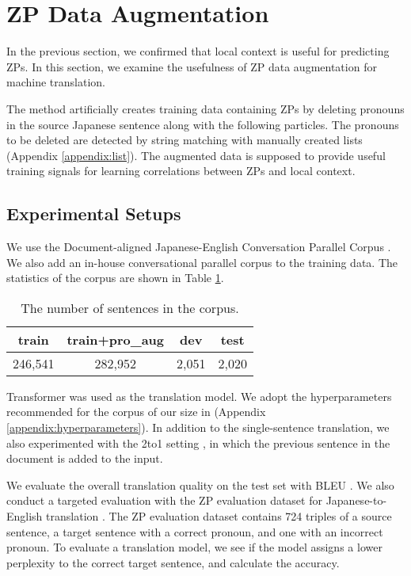 \section{ZP Data Augmentation}
\label{section:experiments}

In the previous section, we confirmed that local context is useful for predicting ZPs.
In this section, we examine the usefulness of ZP data augmentation for machine translation.

The method artificially creates training data containing ZPs by deleting pronouns in the source Japanese sentence along with the following particles.
The pronouns to be deleted are detected by string matching with manually created lists (Appendix \ref{appendix:list}).
The augmented data is supposed to provide useful training signals for learning correlations between ZPs and local context.


\subsection{Experimental Setups}
We use the Document-aligned Japanese-English Conversation Parallel Corpus \citep{rikters-EtAl:2020:WMT}.
We also add an in-house conversational parallel corpus to the training data. The statistics of the corpus are shown in Table \ref{corpus:stat}.

\begin{table}[!h]
\centering
\begin{tabular}{cccc} \toprule
train    & train+pro\_aug     & dev       & test     \\ \midrule
\multicolumn{1}{c}{246,541} & \multicolumn{1}{c}{282,952} & \multicolumn{1}{c}{2,051} & \multicolumn{1}{c}{2,020} \\ \bottomrule
\end{tabular}
\caption{The number of sentences in the corpus.}
\label{corpus:stat}
\end{table}

Transformer \citep{NIPS2017_3f5ee243} was used as the translation model. We adopt the hyperparameters recommended for the corpus of our size in \citet{araabi-monz-2020-optimizing} (Appendix \ref{appendix:hyperparameters}). In addition to the single-sentence translation, we also experimented with the 2to1 setting \citep{tiedemann-scherrer-2017-neural}, in which the previous sentence in the document is added to the input.

We evaluate the overall translation quality on the test set with BLEU \citep{papineni-etal-2002-bleu}.
We also conduct a targeted evaluation with the ZP evaluation dataset for Japanese-to-English translation \citep{shimazu-etal-2020-evaluation}. The ZP evaluation dataset contains 724 triples of a source sentence, a target sentence with a correct pronoun, and one with an incorrect pronoun.
To evaluate a translation model, we see if the model assigns a lower perplexity to the correct target sentence, and calculate the accuracy.

